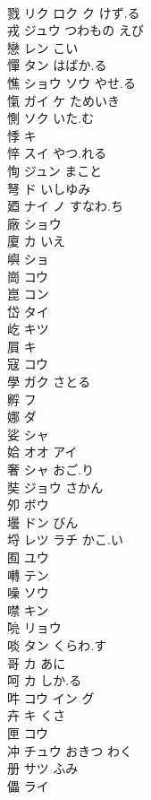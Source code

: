\documentclass[8pt]{extreport}
\begin{document}
\begin{CJK}{UTF8}{min}
\\	戮	リク ロク ク けず.る			
\\	戎	ジュウ つわもの えび			
\\	戀	レン こい			
\\	憚	タン はばか.る			
\\	憔	ショウ ソウ やせ.る			
\\	愾	ガイ ケ ためいき			
\\	惻	ソク いた.む			
\\	悸	キ			
\\	悴	スイ やつ.れる			
\\	恂	ジュン まこと			
\\	弩	ド いしゆみ			
\\	廼	ナイ ノ すなわ.ち			
\\	廠	ショウ			
\\	廈	カ いえ			
\\	嶼	ショ			
\\	崗	コウ			
\\	崑	コン			
\\	岱	タイ			
\\	屹	キツ			
\\	屓	キ			
\\	寇	コウ					
\\	學	ガク さとる					
\\	孵	フ			
\\	娜	ダ			
\\	娑	シャ			
\\	姶	オオ アイ			
\\	奢	シャ おご.り			
\\	奘	ジョウ さかん			
\\	夘	ボウ			
\\	壜	ドン びん			
\\	埒	レツ ラチ かこ.い			
\\	囿	ユウ			
\\	囀	テン			
\\	噪	ソウ			
\\	噤	キン			
\\	喨	リョウ			
\\	啖	タン くらわ.す			
\\	哥	カ あに			
\\	呵	カ しか.る			
\\	吽	コウ イン グ			
\\	卉	キ くさ			
\\	匣	コウ			
\\	冲	チュウ おきつ わく			
\\	册	サツ ふみ			
\\	儡	ライ			

\end{CJK}
\end{document}

